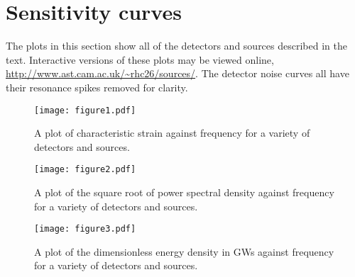 \vspace{1cm}
\appendix
\section{Sensitivity curves}\label{app:a}
The plots in this section show all of the detectors and sources described in the text. Interactive versions of these plots may be viewed online, \url{http://www.ast.cam.ac.uk/~rhc26/sources/}. The detector noise curves all have their resonance spikes removed for clarity. 
\begin{figure}[h!]
 \centering
 \texttt{[image: figure1.pdf]}
 \caption{A plot of characteristic strain against frequency for a variety of detectors and sources.}
 \label{fig:hc}
\end{figure}
\begin{figure}[h!]
 \centering
 \texttt{[image: figure2.pdf]}
 \caption{A plot of the square root of power spectral density against frequency for a variety of detectors and sources.}
 \label{fig:S}
\end{figure}
\begin{figure}[h!]
 \centering
 \texttt{[image: figure3.pdf]}
 \caption{A plot of the dimensionless energy density in GWs against frequency for a variety of detectors and sources.}
 \label{fig:omega}
\end{figure}




